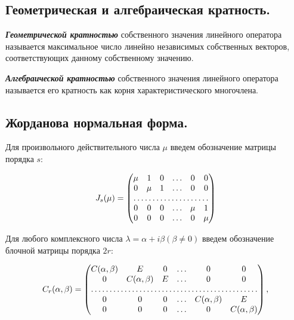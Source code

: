 \newpage


\subsection{
    Геометрическая и алгебраическая кратность.
}

\begin{definition}
    \textbf{\textit{Геометрической кратностью}} собственного значения линейного оператора называется максимальное число линейно независимых собственных векторов, соответствующих данному собственному значению.
\end{definition}

\begin{definition}
    \textbf{\textit{Алгебраической кратностью}} собственного значения линейного оператора называется его кратность как корня характеристического многочлена.
\end{definition}


\newpage


\subsection{
    Жорданова нормальная форма.
}

Для произвольного действительного числа $\mu$ введем обозначение матрицы порядка $s$:

$$J_s(\mu) = \begin{pmatrix} 
    \mu & 1 & 0 & \ldots & 0 & 0 \\
    0 & \mu & 1 & \ldots & 0 & 0 \\
    \hdotsfor6 \\
    0 & 0 & 0 & \ldots & \mu & 1 \\
    0 & 0 & 0 & \ldots & 0 & \mu
\end{pmatrix}$$

Для любого комплексного числа $\lambda = \alpha + i\beta (\beta \ne 0)$ введем обозначение блочной матрицы порядка $2r$:

$$C_r(\alpha, \beta) = \begin{pmatrix} 
    C(\alpha, \beta) & E & 0 & \ldots & 0 & 0 \\
    0 & C(\alpha, \beta) & E & \ldots & 0 & 0 \\
    \hdotsfor6 \\
    0 & 0 & 0 & \ldots & C(\alpha, \beta) & E \\
    0 & 0 & 0 & \ldots & 0 & C(\alpha, \beta)
\end{pmatrix},$$

